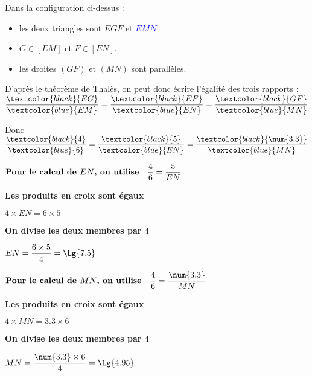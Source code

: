 \begin{corrige}
\begin{multicols}{2}
\begin{enumerate}
        {\color{red}    
        Dans la configuration ci-dessus : 
        \begin{itemize}
            \item les deux triangles sont \textcolor{black}{$EGF$} et \textcolor{blue}{$EMN$}.
            \item $G \in [EM]$ et $F \in [EN]$.
            \item les droites $(GF)$ et $(MN)$ sont parallèles.                
        \end{itemize}
        \columnbreak
        D'après le théorème de Thalès, on peut donc écrire l'égalité des trois rapports :
        $\dfrac{\textcolor{black}{EG}}{\textcolor{blue}{EM}}=\dfrac{\textcolor{black}{EF}}{\textcolor{blue}{EN}}=\dfrac{\textcolor{black}{GF}}{\textcolor{blue}{MN}}$
        
        Donc $\dfrac{\textcolor{black}{4}}{\textcolor{blue}{6}}=\dfrac{\textcolor{black}{5}}{\textcolor{blue}{EN}}=\dfrac{\textcolor{black}{\num{3.3}}}{\textcolor{blue}{MN}}$
        }
    \end{enumerate} 
   
    {\color{red}    
        $\mbox{\bf Pour le calcul de $EN$, on utilise} \quad \dfrac{4}{6}=\dfrac{5}{EN}$

        {\bf Les produits en croix sont égaux}
        
        $4\times EN=6\times 5$

        {\bf On divise les deux membres par $4$}
        
        $EN=\dfrac{6\times 5}{4}=\Lg{7.5}$
    }        

    {\color{red}    
        $\mbox{\bf Pour le calcul de $MN$, on utilise} \quad \dfrac{4}{6}=\dfrac{\num{3.3}}{MN}$

        {\bf Les produits en croix sont égaux}
        
        $4\times MN=\num{3.3}\times 6$

        {\bf On divise les deux membres par $4$}
        
        $MN=\dfrac{\num{3.3}\times 6}{4}=\Lg{4.95}$
    }          
    \end{multicols}
\end{corrige}